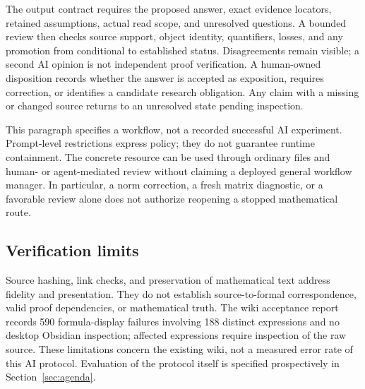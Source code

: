 The output contract requires the proposed answer, exact evidence locators, retained assumptions, actual read scope, and unresolved questions. A bounded review then checks source support, object identity, quantifiers, losses, and any promotion from conditional to established status. Disagreements remain visible; a second AI opinion is not independent proof verification. A human-owned disposition records whether the answer is accepted as exposition, requires correction, or identifies a candidate research obligation. Any claim with a missing or changed source returns to an unresolved state pending inspection.

This paragraph specifies a workflow, not a recorded successful AI experiment. Prompt-level restrictions express policy; they do not guarantee runtime containment. The concrete resource can be used through ordinary files and human- or agent-mediated review without claiming a deployed general workflow manager. In particular, a norm correction, a fresh matrix diagnostic, or a favorable review alone does not authorize reopening a stopped mathematical route.

\subsection{Verification limits}
Source hashing, link checks, and preservation of mathematical text address fidelity and presentation. They do not establish source-to-formal correspondence, valid proof dependencies, or mathematical truth. The wiki acceptance report records 590 formula-display failures involving 188 distinct expressions and no desktop Obsidian inspection; affected expressions require inspection of the raw source. These limitations concern the existing wiki, not a measured error rate of this AI protocol. Evaluation of the protocol itself is specified prospectively in Section~\ref{sec:agenda}.
